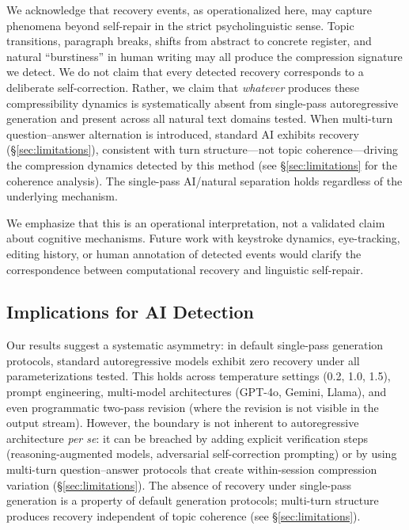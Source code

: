 \documentclass[11pt]{article}
\begin{document}
We acknowledge that recovery events, as operationalized here, may capture phenomena beyond self-repair in the strict psycholinguistic sense. Topic transitions, paragraph breaks, shifts from abstract to concrete register, and natural ``burstiness'' in human writing may all produce the compression signature we detect. We do not claim that every detected recovery corresponds to a deliberate self-correction. Rather, we claim that \textit{whatever} produces these compressibility dynamics is systematically absent from single-pass autoregressive generation and present across all natural text domains tested. When multi-turn question--answer alternation is introduced, standard AI exhibits recovery (\S\ref{sec:limitations}), consistent with turn structure---not topic coherence---driving the compression dynamics detected by this method (see \S\ref{sec:limitations} for the coherence analysis). The single-pass AI/natural separation holds regardless of the underlying mechanism.

We emphasize that this is an operational interpretation, not a validated claim about cognitive mechanisms. Future work with keystroke dynamics, eye-tracking, editing history, or human annotation of detected events would clarify the correspondence between computational recovery and linguistic self-repair.

\subsection{Implications for AI Detection}

Our results suggest a systematic asymmetry: in default single-pass generation protocols, standard autoregressive models exhibit zero recovery under all parameterizations tested. This holds across temperature settings (0.2, 1.0, 1.5), prompt engineering, multi-model architectures (GPT-4o, Gemini, Llama), and even programmatic two-pass revision (where the revision is not visible in the output stream). However, the boundary is not inherent to autoregressive architecture \textit{per se}: it can be breached by adding explicit verification steps (reasoning-augmented models, adversarial self-correction prompting) or by using multi-turn question--answer protocols that create within-session compression variation (\S\ref{sec:limitations}). The absence of recovery under single-pass generation is a property of default generation protocols; multi-turn structure produces recovery independent of topic coherence (see \S\ref{sec:limitations}).
\end{document}
